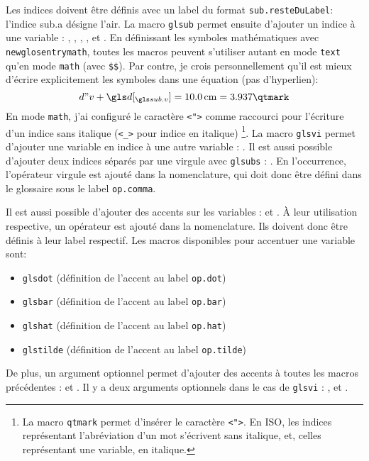 \documentclass[PhD,nohyperref,english,french]{ulthese}
\begin{document}
Les indices doivent être définis avec un label du format \texttt{sub.resteDuLabel}: l'indice \gls{sub.a} désigne l'air. La macro \texttt{glsub} permet ensuite d'ajouter un indice à une variable : , , , ,  et . En définissant les symboles mathématiques avec \texttt{newglosentrymath}, toutes les macros peuvent s'utiliser autant en mode \texttt{text} qu'en mode \texttt{math} (avec \texttt{\$\$}). Par contre, je crois personnellement qu'il est mieux d'écrire explicitement les symboles dans une équation (pas d'hyperlien):
\begin{equation}
d"v + \glsub{d}{v} = \SI{10.0}{\centi\meter} = 3.937\qtmark
\end{equation}
En mode \texttt{math}, j'ai configuré le caractère \texttt{<">} comme raccourci pour l'écriture d'un indice sans italique (\texttt{<\_>} pour indice en italique) \footnote{ La macro \texttt{qtmark} permet d'insérer le caractère \texttt{<">}. En ISO, les indices représentant l'abréviation d'un mot s'écrivent sans italique, et, celles représentant une variable, en italique.}. La macro \texttt{glsvi} permet d'ajouter une variable en indice à une autre variable : . Il est aussi possible d'ajouter deux indices séparés par une virgule avec \texttt{glsubs} : . En l’occurrence, l'opérateur virgule est ajouté dans la nomenclature, qui doit donc être défini dans le glossaire sous le label \texttt{op.comma}.

Il est aussi possible d'ajouter des accents sur les variables :  et . À leur utilisation respective, un opérateur est ajouté dans la nomenclature. Ils doivent donc être définis à leur label respectif. Les macros disponibles pour accentuer une variable sont:
\begin{itemize} 
	\item \texttt{glsdot} (définition de l'accent au label \texttt{op.dot})
	\item \texttt{glsbar} (définition de l'accent au label \texttt{op.bar})
	\item \texttt{glshat} (définition de l'accent au label \texttt{op.hat})
	\item \texttt{glstilde} (définition de l'accent au label \texttt{op.tilde})
\end{itemize}
De plus, un argument optionnel permet d'ajouter des accents à toutes les macros précédentes :  et . Il y a deux arguments optionnels dans le cas de \texttt{glsvi} : ,  et .
\end{document}

